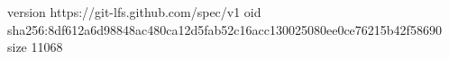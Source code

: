 version https://git-lfs.github.com/spec/v1
oid sha256:8df612a6d98848ac480ca12d5fab52c16acc130025080ee0ce76215b42f58690
size 11068

